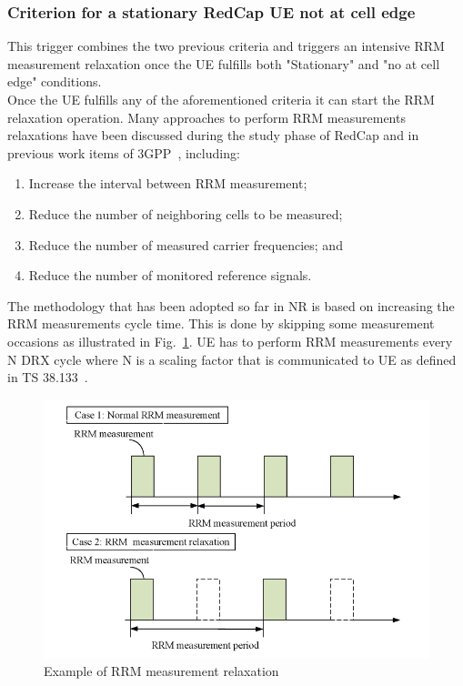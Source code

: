 \documentclass[]{IEEEtran}
\begin{document}
\subsubsection*{\textbf{Criterion for a stationary RedCap UE not at cell edge}} This trigger combines the two previous criteria and triggers an intensive RRM measurement relaxation once the UE fulfills both "Stationary" and "no at cell edge" conditions. \\


Once the UE fulfills any of the aforementioned criteria it can start the RRM relaxation operation. Many approaches to perform RRM measurements relaxations have been discussed during the study phase of RedCap and in previous work items of 3GPP~\cite{3gpp_ue_2019_R2-1912335,3gpp_rrm_2019_R2-1912334,1912531_R2-1912531}, including:
\begin{enumerate}
    \item Increase the interval between RRM measurement;
    \item Reduce the number of neighboring cells to be measured;
    \item Reduce the number of measured carrier frequencies; and
    \item Reduce the number of monitored reference signals.
\end{enumerate}
The methodology that has been adopted so far in NR is based on increasing the RRM measurements cycle time. This is done by skipping some measurement occasions as illustrated in Fig.~\ref{fig:rrm-relaxation}. UE has to perform RRM measurements every N DRX cycle where N is a scaling factor that is communicated to UE as defined in TS 38.133~\cite{3gpp_nr_2022-11_38.133}.

\begin{figure}
    \centering
    \includegraphics[width=\linewidth]{Pictures/RRM measurement relaxation.png}
    \caption{Example of RRM measurement relaxation}
    \label{fig:rrm-relaxation}
\end{figure}
\end{document}

